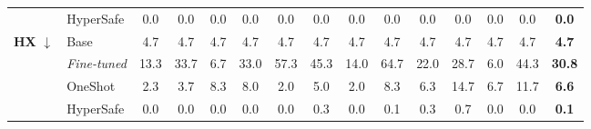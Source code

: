 \begin{table}[!t]
{\begin{tabular}{@{}l l@{\hspace{6pt}} cccc cccc cccc @{\hspace{6pt}} >{\bfseries}c@{}}
 & HyperSafe           & \textcolor{wingreen}{0.0} & \textcolor{wingreen}{0.0} & \textcolor{wingreen}{0.0} & \textcolor{wingreen}{0.0}
                       & \textcolor{wingreen}{0.0} & \textcolor{wingreen}{0.0} & \textcolor{wingreen}{0.0} & \textcolor{wingreen}{0.0}
                       & \textcolor{wingreen}{0.0} & \textcolor{wingreen}{0.0} & \textcolor{wingreen}{0.0} & \textcolor{wingreen}{0.0} & \textcolor{wingreen}{0.0} \\
\cmidrule{1-15}
\multirow{4}{*}{\textbf{HX} $\downarrow$}
 & Base                & 4.7 & 4.7 & 4.7 & 4.7 & 4.7 & 4.7 & 4.7 & 4.7 & 4.7 & 4.7 & 4.7 & 4.7 & 4.7 \\
 & \cellcolor{mutegray}\textit{Fine-tuned}
   & \cellcolor{mutegray}13.3 & \cellcolor{mutegray}33.7 & \cellcolor{mutegray}6.7 & \cellcolor{mutegray}33.0
   & \cellcolor{mutegray}57.3 & \cellcolor{mutegray}45.3 & \cellcolor{mutegray}14.0 & \cellcolor{mutegray}64.7
   & \cellcolor{mutegray}22.0 & \cellcolor{mutegray}28.7 & \cellcolor{mutegray}6.0 & \cellcolor{mutegray}44.3 & \cellcolor{mutegray}30.8 \\
 & OneShot             & 2.3 & 3.7 & \textcolor{warnred}{8.3} & \textcolor{warnred}{8.0} & 2.0 & \textcolor{warnred}{5.0} & 2.0 & \textcolor{warnred}{8.3} & \textcolor{warnred}{6.3} & \textcolor{warnred}{14.7} & \textcolor{warnred}{6.7} & \textcolor{warnred}{11.7} & \textcolor{warnred}{6.6} \\
 & HyperSafe           & \textcolor{wingreen}{0.0} & \textcolor{wingreen}{0.0} & \textcolor{wingreen}{0.0} & \textcolor{wingreen}{0.0}
                       & \textcolor{wingreen}{0.0} & \textcolor{wingreen}{0.3} & \textcolor{wingreen}{0.0} & \textcolor{wingreen}{0.1}
                       & \textcolor{wingreen}{0.3} & \textcolor{wingreen}{0.7} & \textcolor{wingreen}{0.0} & \textcolor{wingreen}{0.0} & \textcolor{wingreen}{0.1} \\
\bottomrule
\end{tabular}%
}
\end{table}
